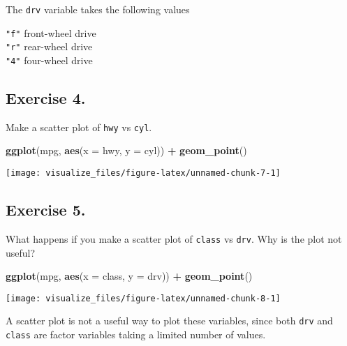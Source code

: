\documentclass[]{book}
\newenvironment{Shaded}{\begin{snugshade}}{\end{snugshade}}
\newcommand{\DataTypeTok}[1]{\textcolor[rgb]{0.13,0.29,0.53}{#1}}
\newcommand{\KeywordTok}[1]{\textcolor[rgb]{0.13,0.29,0.53}{\textbf{#1}}}
\newcommand{\NormalTok}[1]{#1}
\newcommand{\OperatorTok}[1]{\textcolor[rgb]{0.81,0.36,0.00}{\textbf{#1}}}
\newcommand{\StringTok}[1]{\textcolor[rgb]{0.31,0.60,0.02}{#1}}
\theoremstyle{plain}
\theoremstyle{remark}
\theoremstyle{definition}
\theoremstyle{definition}
\theoremstyle{definition}
\theoremstyle{remark}
\begin{document}
The \texttt{drv} variable takes the following values

\texttt{"f"} \textbar{} front-wheel drive \textbar{}\\
\texttt{"r"} \textbar{} rear-wheel drive \textbar{}\\
\texttt{"4"} \textbar{} four-wheel drive \textbar{}

\hypertarget{exercise-4.}{%
\subsection{Exercise 4.}\label{exercise-4.}}

Make a scatter plot of \texttt{hwy} vs \texttt{cyl}.

\begin{Shaded}
\begin{Highlighting}[]
\KeywordTok{ggplot}\NormalTok{(mpg, }\KeywordTok{aes}\NormalTok{(}\DataTypeTok{x =}\NormalTok{ hwy, }\DataTypeTok{y =}\NormalTok{ cyl)) }\OperatorTok{+}
\StringTok{  }\KeywordTok{geom_point}\NormalTok{()}
\end{Highlighting}
\end{Shaded}

\begin{center}\texttt{[image: visualize\_files/figure-latex/unnamed-chunk-7-1]} \end{center}

\hypertarget{exercise-5.}{%
\subsection{Exercise 5.}\label{exercise-5.}}

What happens if you make a scatter plot of \texttt{class} vs
\texttt{drv}. Why is the plot not useful?

\begin{Shaded}
\begin{Highlighting}[]
\KeywordTok{ggplot}\NormalTok{(mpg, }\KeywordTok{aes}\NormalTok{(}\DataTypeTok{x =}\NormalTok{ class, }\DataTypeTok{y =}\NormalTok{ drv)) }\OperatorTok{+}
\StringTok{  }\KeywordTok{geom_point}\NormalTok{()}
\end{Highlighting}
\end{Shaded}

\begin{center}\texttt{[image: visualize\_files/figure-latex/unnamed-chunk-8-1]} \end{center}

A scatter plot is not a useful way to plot these variables, since both
\texttt{drv} and \texttt{class} are factor variables taking a limited
number of values.
\end{document}
